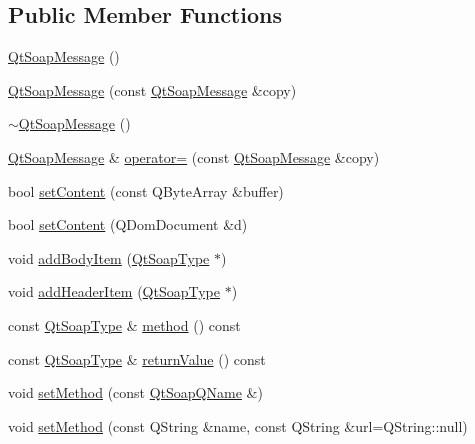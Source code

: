 \subsection*{Public Member Functions}
\begin{DoxyCompactItemize}
\item 
\mbox{\hyperlink{class_qt_soap_message_ac3bdd2fcf2cf21e519a0b33862c2cf59}{Qt\+Soap\+Message}} ()
\item 
\mbox{\hyperlink{class_qt_soap_message_a1e060067d5ddcef2bf25899f70d1713a}{Qt\+Soap\+Message}} (const \mbox{\hyperlink{class_qt_soap_message}{Qt\+Soap\+Message}} \&copy)
\item 
\mbox{\hyperlink{class_qt_soap_message_ac71afb2d55c00f27b793e99380cdcc32}{$\sim$\+Qt\+Soap\+Message}} ()
\item 
\mbox{\hyperlink{class_qt_soap_message}{Qt\+Soap\+Message}} \& \mbox{\hyperlink{class_qt_soap_message_acfd530c3e58c9443ddf74b36c922754c}{operator=}} (const \mbox{\hyperlink{class_qt_soap_message}{Qt\+Soap\+Message}} \&copy)
\item 
bool \mbox{\hyperlink{class_qt_soap_message_a535e4eaf3d1c0372ec30e02e790b6b58}{set\+Content}} (const Q\+Byte\+Array \&buffer)
\item 
bool \mbox{\hyperlink{class_qt_soap_message_a0e22e5782ee668dbcd3218428ea3a062}{set\+Content}} (Q\+Dom\+Document \&d)
\item 
void \mbox{\hyperlink{class_qt_soap_message_a16c43285b934153623d541f061dd1910}{add\+Body\+Item}} (\mbox{\hyperlink{class_qt_soap_type}{Qt\+Soap\+Type}} $\ast$)
\item 
void \mbox{\hyperlink{class_qt_soap_message_a61b9c16754a167088a107eb34473683e}{add\+Header\+Item}} (\mbox{\hyperlink{class_qt_soap_type}{Qt\+Soap\+Type}} $\ast$)
\item 
const \mbox{\hyperlink{class_qt_soap_type}{Qt\+Soap\+Type}} \& \mbox{\hyperlink{class_qt_soap_message_a83b058700a430911c883a4cda80299c2}{method}} () const
\item 
const \mbox{\hyperlink{class_qt_soap_type}{Qt\+Soap\+Type}} \& \mbox{\hyperlink{class_qt_soap_message_ac223f69e31d5f9ff251a467149c547d5}{return\+Value}} () const
\item 
void \mbox{\hyperlink{class_qt_soap_message_a792f4e366d4bf4c3ca09ea6f034237b5}{set\+Method}} (const \mbox{\hyperlink{class_qt_soap_q_name}{Qt\+Soap\+Q\+Name}} \&)
\item 
void \mbox{\hyperlink{class_qt_soap_message_a83fb2dcd2fa4c2bf3ab8e1bb3d76455a}{set\+Method}} (const Q\+String \&name, const Q\+String \&url=Q\+String\+::null)

\end{DoxyCompactItemize}
